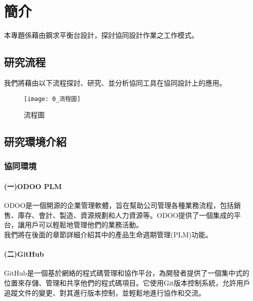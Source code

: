 \chapter{簡介}
\renewcommand{\baselinestretch}{10.0} %
\setcounter{page}{1}  %
\fontsize{14pt}{2.5pt}\sectionef

本專題係藉由鋼求平衡台設計，探討協同設計作業之工作模式。

\section{研究流程}
我們將藉由以下流程探討、研究、並分析協同工具在協同設計上的應用。\\

\begin{figure}[hbt!]
\center
\texttt{[image: 0\_流程圖]}
\caption{\Large 流程圖}\label{0_流程圖}
\end{figure}

\section{研究環境介紹}
\subsection{協同環境}
\fontsize{14pt}{2.5pt}\sectionef\hspace{12pt} 
\subsubsection{(一)ODOO PLM}
\fontsize{14pt}{2.5pt}\sectionef\hspace{12pt} ODOO是一個開源的企業管理軟體，旨在幫助公司管理各種業務流程，包括銷售、庫存、會計、製造、資源規劃和人力資源等。ODOO提供了一個集成的平台，讓用戶可以輕鬆地管理他們的業務活動。\\
\fontsize{14pt}{2.5pt}\sectionef\hspace{12pt}
我們將在後面的章節詳細介紹其中的產品生命週期管理(PLM)功能。\\
\subsubsection{(二)GitHub}
GitHub是一個基於網絡的程式碼管理和協作平台，為開發者提供了一個集中式的位置來存儲、管理和共享他們的程式碼項目。它使用Git版本控制系統，允許用戶追蹤文件的變更、對其進行版本控制，並輕鬆地進行協作和交流。\\

